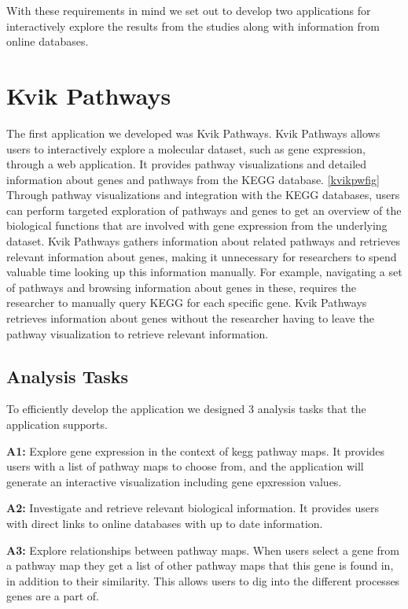 With these requirements in mind we set out to develop two applications for
interactively explore the results from the studies along with information
from online databases. 

\section{Kvik Pathways}
The first application we developed was Kvik Pathways. Kvik Pathways allows users
to interactively explore a molecular dataset, such as gene expression, through a
web application. It provides pathway visualizations and detailed information
about genes and pathways from the KEGG database. \ref{kvikpwfig} Through pathway
visualizations and integration with the KEGG databases, users can perform
targeted exploration of pathways and genes to get an overview of the biological
functions that are involved with gene expression from the underlying dataset.
Kvik Pathways gathers information about related pathways and retrieves relevant
information about genes, making it unnecessary for researchers to spend valuable
time looking up this information manually. For example, navigating a set of
pathways and browsing information about genes in these, requires the researcher
to manually query KEGG for each specific gene.  Kvik Pathways retrieves
information about genes without the researcher having to leave the pathway
visualization to retrieve relevant information.

\subsection{Analysis Tasks} 
To efficiently develop the application we designed 3 analysis tasks that the
application supports. 

\textbf{A1:} Explore gene expression in the context of \gls{kegg} pathway maps.
It provides users with a list of pathway maps to choose from, and the
application will generate an interactive visualization including gene epxression
values. 

\textbf{A2:} Investigate and retrieve relevant biological information. It
provides users with direct links to online databases with up to date
information. 

\textbf{A3:} Explore relationships between pathway maps. When users select a
gene from a pathway map they get a list of other pathway maps that this
gene is found in, in addition to their similarity. This allows users to dig into
the different processes genes are a part of. 

